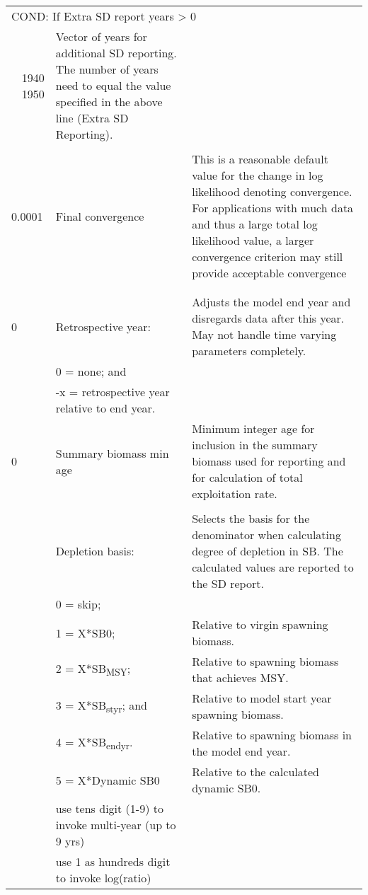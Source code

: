 {\begin{landscape}
\begin{longtable}{p{1.5cm} p{7.2cm} p{12.3cm}}
 \hline  
 \multicolumn{3}{l}{COND: If Extra SD report years > 0} \Tstrut\\

 \multicolumn{1}{r}{1940 1950} & \multirow{1}{1cm}[-0.25cm]{\parbox{19.5cm}{Vector of years for additional SD reporting. The number of years need to equal the value specified in the above line (Extra SD Reporting).}} \Tstrut\\
  & & \\

 
 \hline
 0.0001 & Final convergence & \multirow{1}{1cm}[-0.25cm]{\parbox{12.5cm}{This is a reasonable default value for the change in log likelihood denoting convergence. For applications with much data and thus a large total log likelihood value, a larger convergence criterion may still provide acceptable convergence}} \Tstrut\Bstrut\\
   & & \Bstrut\\
   & & \Bstrut\\
 
 \hline
 0 & Retrospective year: & \multirow{1}{1cm}[-0.25cm]{\parbox{12.5cm}{Adjusts the model end year and disregards data after this year. May not handle time varying parameters completely.}} \Tstrut\\
   & 0 = none; and & \\
   & -x = retrospective year relative to end year. & \Bstrut\\
  
 \hline
 0 & Summary biomass min age & \multirow{1}{1cm}[-0.25cm]{\parbox{12.5cm}{Minimum integer age for inclusion in the summary biomass used for reporting and for calculation of total exploitation rate.}} \Tstrut\\
   & & \\ 

 \pagebreak
 1 & Depletion basis: & \multirow{1}{1cm}[-0.25cm]{\parbox{12.5cm}{Selects the basis for the denominator when calculating degree of depletion in SB. The calculated values are reported to the SD report.}} \Tstrut\\
   & 0 = skip; & \\
   & 1 = X*SB0; & Relative to virgin spawning biomass. \\
   & 2 = X*SB\textsubscript{MSY}; & Relative to spawning biomass that achieves MSY. \\
   & 3 = X*SB\textsubscript{styr}; and & Relative to model start year spawning biomass. \\
   & 4 = X*SB\textsubscript{endyr}. & Relative to spawning biomass in the model end year. \\
   & 5 = X*Dynamic SB0 & Relative to the calculated dynamic SB0. \\
   & use tens digit (1-9) to invoke multi-year (up to 9 yrs) & \\
   & use 1 as hundreds digit to invoke log(ratio) & \Bstrut\\
  

\end{longtable}
\end{landscape}}
